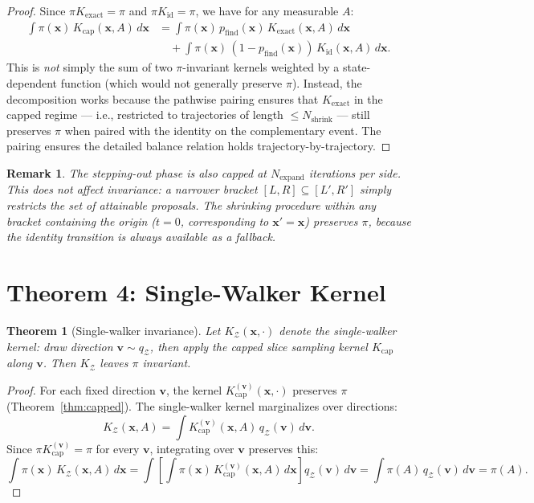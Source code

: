 \documentclass[12pt]{article}
\newtheorem{theorem}{Theorem}
\newtheorem{remark}{Remark}
\newcommand{\Zmat}{\mathcal{Z}}
\newcommand{\bx}{\mathbf{x}}
\newcommand{\bv}{\mathbf{v}}
\begin{document}
\begin{proof}
Since $\pi K_{\mathrm{exact}} = \pi$ and $\pi K_{\mathrm{id}} = \pi$,
we have for any measurable $A$:
\begin{align*}
    \int \pi(\bx)\, K_{\mathrm{cap}}(\bx, A)\, d\bx
    &= \int \pi(\bx)\, p_{\mathrm{find}}(\bx)\, K_{\mathrm{exact}}(\bx, A)\, d\bx \\
    &\quad + \int \pi(\bx)\, (1 - p_{\mathrm{find}}(\bx))\, K_{\mathrm{id}}(\bx, A)\, d\bx.
\end{align*}
This is \emph{not} simply the sum of two $\pi$-invariant kernels
weighted by a state-dependent function (which would not generally
preserve $\pi$). Instead, the decomposition works because the
pathwise pairing ensures that $K_{\mathrm{exact}}$ in the capped
regime --- i.e., restricted to trajectories of length
$\leq N_{\mathrm{shrink}}$ --- still preserves $\pi$ when paired
with the identity on the complementary event. The pairing ensures
the detailed balance relation holds trajectory-by-trajectory.
\end{proof}

\begin{remark}
The stepping-out phase is also capped at $N_{\mathrm{expand}}$
iterations per side. This does not affect invariance: a narrower
bracket $[L, R] \subseteq [L', R']$ simply restricts the set of
attainable proposals. The shrinking procedure within any bracket
containing the origin ($t = 0$, corresponding to $\bx' = \bx$)
preserves $\pi$, because the identity transition is always available as
a fallback.
\end{remark}

\section*{Theorem 4: Single-Walker Kernel}

\begin{theorem}[Single-walker invariance]
\label{thm:walker}
Let $K_\Zmat(\bx, \cdot)$ denote the single-walker kernel: draw
direction $\bv \sim q_\Zmat$, then apply the capped slice sampling
kernel $K_{\mathrm{cap}}$ along $\bv$. Then $K_\Zmat$ leaves $\pi$
invariant.
\end{theorem}

\begin{proof}
For each fixed direction $\bv$, the kernel
$K_{\mathrm{cap}}^{(\bv)}(\bx, \cdot)$ preserves $\pi$
(Theorem~\ref{thm:capped}). The single-walker kernel marginalizes
over directions:
\[
    K_\Zmat(\bx, A) = \int K_{\mathrm{cap}}^{(\bv)}(\bx, A)\,
    q_\Zmat(\bv)\, d\bv.
\]
Since $\pi K_{\mathrm{cap}}^{(\bv)} = \pi$ for every $\bv$,
integrating over $\bv$ preserves this:
\[
    \int \pi(\bx)\, K_\Zmat(\bx, A)\, d\bx
    = \int \left[\int \pi(\bx)\, K_{\mathrm{cap}}^{(\bv)}(\bx, A)\,
    d\bx\right] q_\Zmat(\bv)\, d\bv
    = \int \pi(A)\, q_\Zmat(\bv)\, d\bv = \pi(A).
\]
\end{proof}
\end{document}
